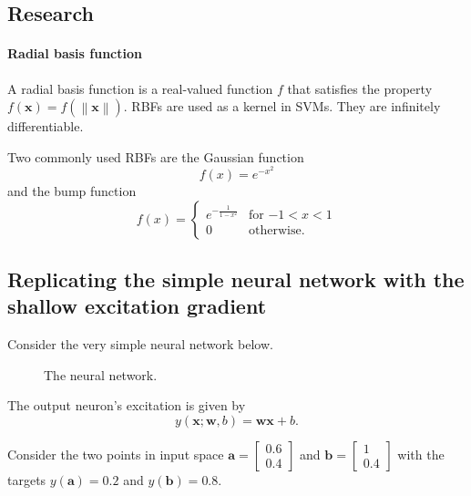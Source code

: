\documentclass{article}
\renewcommand\vec{\mathbf}
\newcommand{\norm}[1]{\left\lVert#1\right\rVert}
\begin{document}
\subsection{Research}

\paragraph{Radial basis function}
A radial basis function is a real-valued function $f$ that satisfies the property $f(\vec{x}) = f(\norm{\vec{x}})$. 
RBFs are used as a kernel in SVMs. 
They are infinitely differentiable.

Two commonly used RBFs are the Gaussian function
$$ f(x) = e^{-x^2} $$
and the bump function
$$ f(x) = 
\begin{cases}
    e^{-\frac{1}{1-x^2}} & \text{for $-1<x<1$} \\
    0 & \text{otherwise}.
\end{cases}
$$

\subsection{Replicating the simple neural network with the shallow excitation gradient}
\label{sec:week5:shallownet}
Consider the very simple neural network below. 
\begin{figure}[h]
    \begin{center}
    \end{center}
    \caption{The neural network.}
    \label{fig:week5:shallownet}
\end{figure}

The output neuron's excitation is given by 
\begin{equation*}
    y(\vec{x}; \vec{w}, b) = \vec{w} \vec{x} + b.
\end{equation*}

Consider the two points in input space
$\vec{a} = 
\begin{bmatrix}
    0.6 \\ 0.4
\end{bmatrix}$
and
$\vec{b} = 
\begin{bmatrix}
    1 \\ 0.4
\end{bmatrix}$
with the targets $y(\vec{a}) = 0.2$ and $y(\vec{b}) = 0.8$.
\end{document}
